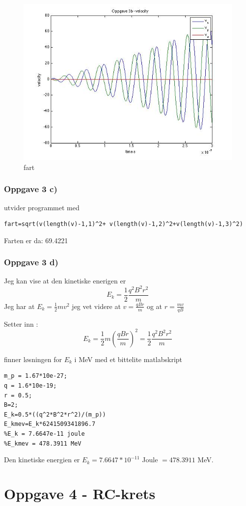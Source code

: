 \documentclass[12pt,a4paper,final,leqno]{report}
\begin{document}
\begin{figure}[H]
\caption{fart}
\centering
\includegraphics[width=\textwidth]{oppgave3bv.jpg}
\end{figure}
\subsection*{Oppgave 3 c)}
utvider programmet med
\begin{verbatim}
fart=sqrt(v(length(v)-1,1)^2+ v(length(v)-1,2)^2+v(length(v)-1,3)^2)
\end{verbatim}
Farten er da: 69.4221
\newpage
\subsection*{Oppgave 3 d)}
Jeg kan vise at den kinetiske enerigen er
$$
E_k=\frac{1}{2}\frac{q^2B^2r^2}{m}
$$
Jeg har at $E_k=\frac{1}{2} mv^2$  jeg vet videre at $v=\frac{qBr}{m}$  og at $r=\frac{mv}{qB}$ 

Setter inn :
$$
E_k=\frac{1}{2} m (\frac{qBr}{m})^2=\frac{1}{2} \frac{q^2B^2r^2}{m}
$$

finner løsningen for $E_k$ i MeV med et bittelite matlabskript
\begin{verbatim}
m_p = 1.67*10e-27;
q = 1.6*10e-19;
r = 0.5;
B=2;
E_k=0.5*((q^2*B^2*r^2)/(m_p))
E_kmev=E_k*6241509341896.7
%E_k = 7.6647e-11 joule
%E_kmev = 478.3911 MeV
\end{verbatim}
Den kinetiske energien er $E_k = 7.6647*10^{-11}$ Joule $=478.3911$ MeV.

\chapter*{Oppgave 4 - RC-krets} 
\end{document}
